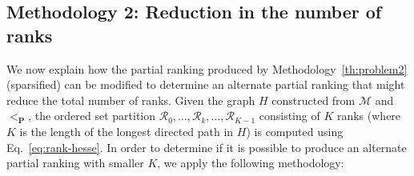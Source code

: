 \documentclass[acmsmall,screen, review]{acmart}
\begin{document}

\subsection{Methodology 2: Reduction in the number of ranks}
 
We now explain how the partial ranking produced by Methodology~\ref{th:problem2} (sparsified) can be modified to determine an alternate partial ranking that might reduce the total number of ranks. 
Given the graph $H$ constructed from $\mathcal{M}$ and $<_{\mathbf{P}}$, the  ordered set partition $\mathcal{R}_0, \dots, \mathcal{R}_k, \dots, \mathcal{R}_{K-1}$ consisting of $K$ ranks (where $K$ is the length of the longest directed path in $H$) is computed using Eq.~\ref{eq:rank-hesse}. In order to determine if it is possible to produce an alternate partial ranking with smaller $K$, we apply the following methodology:
\end{document}
